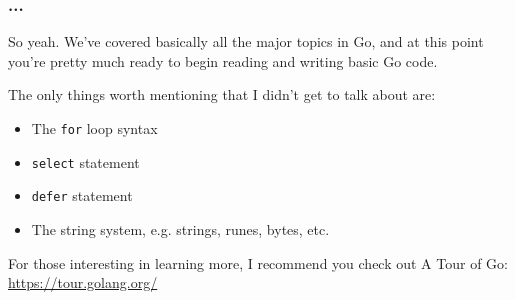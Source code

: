 \documentclass{beamer}
\begin{document}
\begin{frame}
\frametitle{...}

So yeah. We've covered basically all the major topics in Go, and at this point you're pretty much ready to begin reading and writing basic Go code. 

The only things worth mentioning that I didn't get to talk about are:

\vspace{0.5cm}

\begin{itemize}
\item The \texttt{for} loop syntax
\item \texttt{select} statement
\item \texttt{defer} statement
\item The string system, e.g. strings, runes, bytes, etc.
\end{itemize}

\vspace{0.5cm}

For those interesting in learning more, I recommend you check out A Tour of Go: \url{https://tour.golang.org/}

\end{frame}
\end{document}
